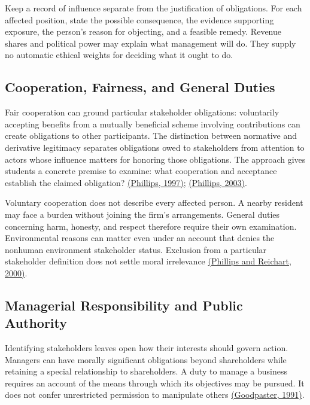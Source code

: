 Keep a record of influence separate from the justification of
obligations. For each affected position, state the possible consequence,
the evidence supporting exposure, the person's reason for objecting, and
a feasible remedy. Revenue shares and political power may explain what
management will do. They supply no automatic ethical weights for
deciding what it ought to do.

\hypertarget{M09-cooperation-fairness-and-general-duties}{%
\subsection{Cooperation, Fairness, and General
Duties}\label{M09-cooperation-fairness-and-general-duties}}

\noindent \noindent Fair cooperation can ground particular stakeholder
obligations: voluntarily accepting benefits from a mutually beneficial
scheme involving contributions can create obligations to other
participants. The distinction between normative and derivative
legitimacy separates obligations owed to stakeholders from attention to
actors whose influence matters for honoring those obligations. The
approach gives students a concrete premise to examine: what cooperation
and acceptance establish the claimed obligation?
\href{https://doi.org/10.2307/3857232}{(Phillips, 1997)};
\href{https://doi.org/10.5840/beq20031312}{(Phillips, 2003)}.

Voluntary cooperation does not describe every affected person. A nearby
resident may face a burden without joining the firm's arrangements.
General duties concerning harm, honesty, and respect therefore require
their own examination. Environmental reasons can matter even under an
account that denies the nonhuman environment stakeholder status.
Exclusion from a particular stakeholder definition does not settle moral
irrelevance \href{https://doi.org/10.1023/A:1006041929249}{(Phillips and
Reichart, 2000)}.

\hypertarget{M09-managerial-responsibility-and-public-authority}{%
\subsection{Managerial Responsibility and Public
Authority}\label{M09-managerial-responsibility-and-public-authority}}

\noindent \noindent Identifying stakeholders leaves open how their interests
should govern action. Managers can have morally significant obligations
beyond shareholders while retaining a special relationship to
shareholders. A duty to manage a business requires an account of the
means through which its objectives may be pursued. It does not confer
unrestricted permission to manipulate others
\href{https://doi.org/10.2307/3857592}{(Goodpaster, 1991)}.


